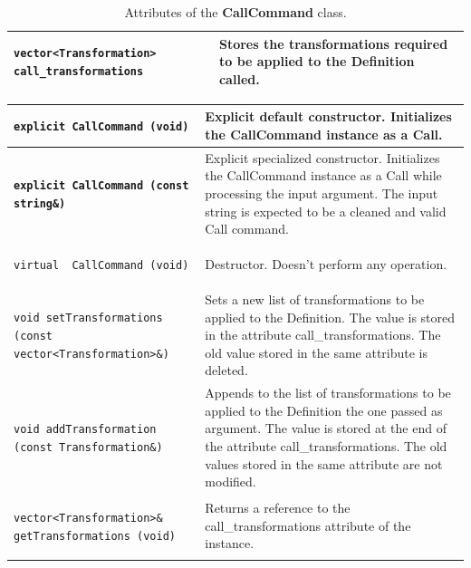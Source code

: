 \documentclass[11pt,twoside,openany,x11names,svgnames]{memoir}
\begin{document}
\begin{table}[h]\footnotesize
\centering
\begin{tabular}{| >{\bfseries}p{6.5cm} | p{9cm} |}
	\hline
	
	\texttt{vector<Transformation> call\_transformations} & Stores the transformations required to be applied to the Definition called. \\

	\hline
\end{tabular}
\caption{Attributes of the \textbf{CallCommand} class.}
\label{tab:CallCommand-Attributes}
\end{table}

\begin{table}[h]\footnotesize
\centering
\begin{tabular}{| >{\bfseries}p{8.5cm} | p{7cm} |}
	\hline
	
	\texttt{explicit CallCommand (void)} & Explicit default constructor. Initializes the CallCommand instance as a Call. \\
	
	\hline
	
	\texttt{explicit CallCommand (const string\&)} & Explicit specialized constructor. Initializes the CallCommand instance as a Call while processing the input argument. The input string is expected to be a cleaned and valid Call command. \\
	
	\hline
	
	\texttt{virtual ~CallCommand (void)} & Destructor. Doesn't perform any operation. \\
	
	\hline
	
	\texttt{void setTransformations (const vector<Transformation>\&)} & Sets a new list of transformations to be applied to the Definition. The value is stored in the attribute call\_transformations. The old value stored in the same attribute is deleted. \\
	
	\hline	
	
	\texttt{void addTransformation (const Transformation\&)} & Appends to the list of transformations to be applied to the Definition the one passed as argument. The value is stored at the end of the attribute call\_transformations. The old values stored in the same attribute are not modified. \\
	
	\hline	
	
	\texttt{vector<Transformation>\& getTransformations (void)} & Returns a reference to the call\_transformations attribute of the instance. \\
	

\end{tabular}
\end{table}
\end{document}
